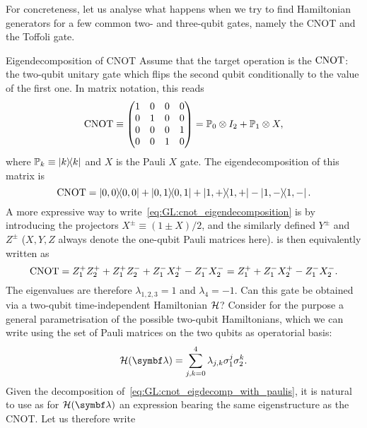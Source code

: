 For concreteness, let us analyse what happens when we try to find Hamiltonian generators for a few common two- and three-qubit gates, namely the CNOT and the Toffoli gate.

\begin{examplebox}[label={ex:GL:eigendecomposition_cnot}]{Eigendecomposition of CNOT}
Assume that the target operation is the $\operatorname{CNOT}$: the two-qubit unitary gate which flips the second qubit conditionally to the value of the first one.
In matrix notation, this reads
\begin{equation}
    \operatorname{CNOT} \equiv\begin{pmatrix}1&0&0&0 \\ 0&1&0&0 \\ 0&0&0&1\\0&0&1&0\end{pmatrix} =
    \mathbb{P}_0\otimes I_2 + \mathbb{P}_1\otimes X,
\end{equation}
where $\mathbb{P}_k\equiv\ketbra k$ and $X$ is the Pauli $X$ gate.
The eigendecomposition of this matrix is
\begin{equation}
    \operatorname{CNOT} =
    \ketbra{0,0} + \ketbra{0,1} + \ketbra{1,+} - \ketbra{1,-}.
    \label{eq:GL:cnot_eigendecomposition}
\end{equation}
A more expressive way to write~\cref{eq:GL:cnot_eigendecomposition} is by introducing the projectors $X^\pm\equiv(1\pm X)/2$, and the similarly defined $Y^\pm$ and $Z^\pm$ ($X,Y,Z$ always denote the one-qubit Pauli matrices here).
 is then equivalently written as
\begin{equation}
    \operatorname{CNOT} =
    Z^+_1 Z^+_2 + Z^+_1 Z^-_2
    + Z^-_1 X^+_2
    - Z^-_1 X^-_2
    = Z_1^+ + Z_1^- X_2^+ - Z_1^- X_2^-.
    \label{eq:GL:cnot_eigdecomp_with_paulis}
\end{equation}
The eigenvalues are therefore $\lambda_{1,2,3}=1$ and $\lambda_4=-1$.
Can this gate be obtained via a two-qubit time-independent Hamiltonian ${\mathcal{H}}$?
Consider for the purpose a general parametrisation of the possible two-qubit Hamiltonians, which we can write using the set of Pauli matrices on the two qubits as operatorial basis:
\begin{equation}
    \calH({\bs\lambda}) =
    \sum_{j,k=0}^4 \lambda_{j,k} \sigma^j_1\sigma^k_2.
\end{equation}
Given the decomposition of~\cref{eq:GL:cnot_eigdecomp_with_paulis}, it is natural to use as \ansatz for $\calH(\bs\lambda)$ an expression bearing the same eigenstructure as the CNOT. Let us therefore write

\end{examplebox}
